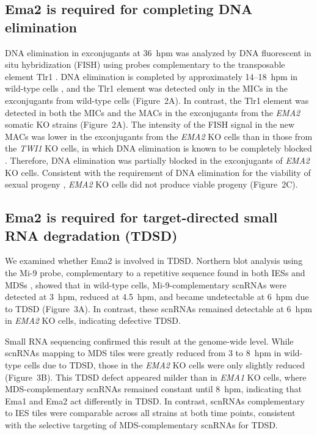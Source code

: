 \documentclass[11pt]{article}
\begin{document}
\subsection{Ema2 is required for completing DNA elimination}

DNA elimination in exconjugants at 36~hpm was analyzed by DNA fluorescent in situ hybridization (FISH) using probes complementary to the transposable element Tlr1 \citep{wuitschick2002}. DNA elimination is completed by approximately 14--18~hpm in wild-type cells \citep{austerberry1984,mutazono2019}, and the Tlr1 element was detected only in the MICs in the exconjugants from wild-type cells (Figure~2A). In contrast, the Tlr1 element was detected in both the MICs and the MACs in the exconjugants from the \textit{EMA2} somatic KO strains (Figure~2A). The intensity of the FISH signal in the new MACs was lower in the exconjugants from the \textit{EMA2} KO cells than in those from the \textit{TWI1} KO cells, in which DNA elimination is known to be completely blocked \citep{noto2015}. Therefore, DNA elimination was partially blocked in the exconjugants of \textit{EMA2} KO cells. Consistent with the requirement of DNA elimination for the viability of sexual progeny \citep{cheng2010,vogt2013}, \textit{EMA2} KO cells did not produce viable progeny (Figure~2C).

\subsection{Ema2 is required for target-directed small RNA degradation (TDSD)}

We examined whether Ema2 is involved in TDSD. Northern blot analysis using the Mi-9 probe, complementary to a repetitive sequence found in both IESs and MDSs \citep{aronica2008}, showed that in wild-type cells, Mi-9-complementary scnRNAs were detected at 3~hpm, reduced at 4.5~hpm, and became undetectable at 6~hpm due to TDSD (Figure~3A). In contrast, these scnRNAs remained detectable at 6~hpm in \textit{EMA2} KO cells, indicating defective TDSD.

Small RNA sequencing confirmed this result at the genome-wide level. While scnRNAs mapping to MDS tiles were greatly reduced from 3 to 8~hpm in wild-type cells due to TDSD, those in the \textit{EMA2} KO cells were only slightly reduced (Figure~3B). This TDSD defect appeared milder than in \textit{EMA1} KO cells, where MDS-complementary scnRNAs remained constant until 8~hpm, indicating that Ema1 and Ema2 act differently in TDSD. In contrast, scnRNAs complementary to IES tiles were comparable across all strains at both time points, consistent with the selective targeting of MDS-complementary scnRNAs for TDSD.
\end{document}
